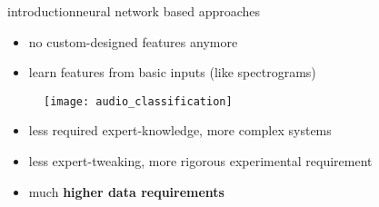         \begin{frame}{introduction}{neural network based approaches}
            \vspace{-3mm}
            \begin{itemize}
                \item   no custom-designed features anymore
                \item   learn features from basic inputs (like spectrograms)
            \end{itemize}
            \begin{figure}%
                \texttt{[image: audio\_classification]}%
            \end{figure}
            \pause
            \begin{itemize}
                \item   less required expert-knowledge, more complex systems
                \item   less expert-tweaking, more rigorous experimental requirement
                \item   much \textcolor{gtgold}{\textbf{higher data requirements}}
            \end{itemize}
            
        \end{frame}
